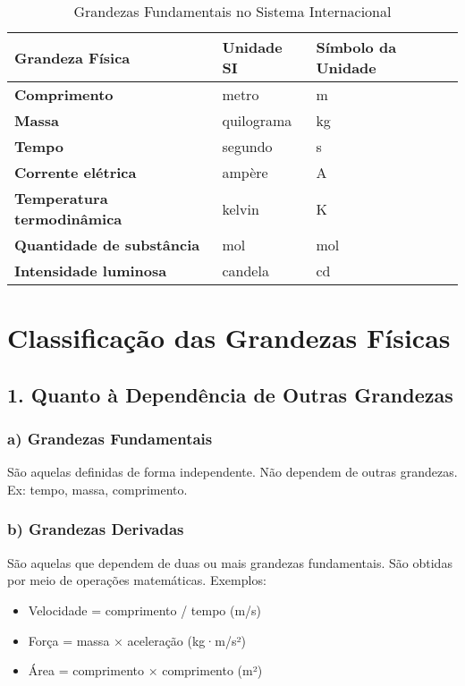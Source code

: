 \documentclass[portuguese,11pt,a4paper,oneside,onecolumn,notitlepage]{article}
\begin{document}
	\begin{table}[H]
		\centering
		\begin{tabular}{>{\bfseries}l l l}
			\toprule
			Grandeza Física & Unidade SI & Símbolo da Unidade \\
			\midrule
			Comprimento     & metro              & m \\
			Massa           & quilograma         & kg \\
			Tempo           & segundo            & s \\
			Corrente elétrica & ampère           & A \\
			Temperatura termodinâmica & kelvin & K \\
			Quantidade de substância & mol        & mol \\
			Intensidade luminosa & candela         & cd \\
			\bottomrule
		\end{tabular}
		\caption{Grandezas Fundamentais no Sistema Internacional}
	\end{table}
	
	\section{Classificação das Grandezas Físicas}
	
	\subsection{1. Quanto à Dependência de Outras Grandezas}
	
	\subsubsection*{a) Grandezas Fundamentais}
	São aquelas definidas de forma independente. Não dependem de outras grandezas. Ex: tempo, massa, comprimento.
	
	\subsubsection*{b) Grandezas Derivadas}
	São aquelas que dependem de duas ou mais grandezas fundamentais. São obtidas por meio de operações matemáticas. Exemplos:
	\begin{itemize}
		\item Velocidade = comprimento / tempo (m/s)
		\item Força = massa × aceleração (kg·m/s²)
		\item Área = comprimento × comprimento (m²)
	\end{itemize}
	
\end{document}
